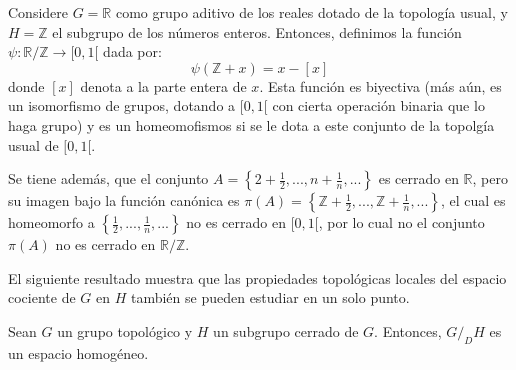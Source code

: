 \documentclass[12pt]{report}
\theoremstyle{largebreak}
\newcommand{\cf}[3]{\ensuremath{#1:#2\rightarrow#3}}
\begin{document}
    \begin{exa}
        Considere $G=\mathbb{R}$ como grupo aditivo de los reales dotado de la topología usual, y $H=\mathbb{Z}$ el subgrupo de los números enteros. Entonces, definimos la función $\cf{\psi}{\mathbb{R}/\mathbb{Z}}{[0,1[}$
        dada por:
        \begin{equation*}
            \psi(\mathbb{Z}+x)=x-[x]
        \end{equation*}
        donde $[x]$ denota a la parte entera de $x$. Esta función es biyectiva (más aún, es un isomorfismo de grupos, dotando a $[0,1[$ con cierta operación binaria que lo haga grupo) y es un homeomofismos si se le dota a este conjunto de la topolgía usual de $[0,1[$.

        Se tiene además, que el conjunto $A=\left\{2+\frac{1}{2},...,n+\frac{1}{n},... \right\}$ es cerrado en $\mathbb{R}$, pero su imagen bajo la función canónica es $\pi(A)=\left\{\mathbb{Z}+\frac{1}{2},...,\mathbb{Z}+\frac{1}{n},... \right\}$, el cual es homeomorfo a $\left\{\frac{1}{2},...,\frac{1}{n},... \right\}$ no es cerrado en $[0,1[$, por lo cual no el conjunto $\pi(A)$ no es cerrado en $\mathbb{R}/\mathbb{Z}$.
    \end{exa}

    El siguiente resultado muestra que las propiedades topológicas locales del espacio cociente de $G$ en $H$ también se pueden estudiar en un solo punto.

    \begin{propo}
        Sean $G$ un grupo topológico y $H$ un subgrupo cerrado de $G$. Entonces, $G/_DH$ es un espacio homogéneo.
    \end{propo}
\end{document}
